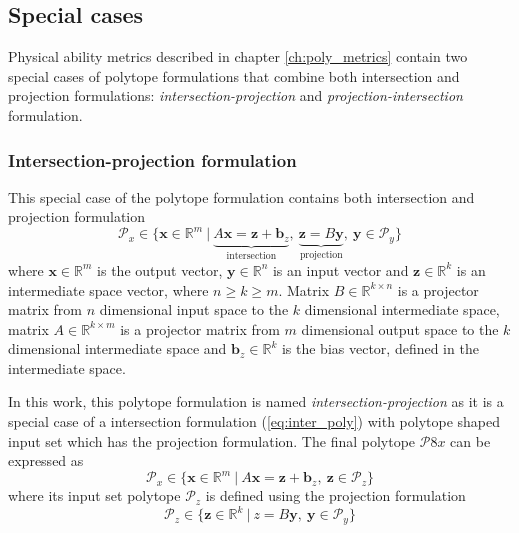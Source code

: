\subsection{Special cases}
\label{ch:combined_forms}
Physical ability metrics described in chapter \ref{ch:poly_metrics} contain two special cases of polytope formulations that combine both intersection and projection formulations: \textit{intersection-projection} and \textit{projection-intersection} formulation.

\subsubsection{Intersection-projection formulation}
\label{ch:inter_proj_form}

This special case of the polytope formulation contains both intersection and projection formulation
\begin{equation}
    \mathcal{P}_x \in \{\bm{x}\in \mathbb{R}^m~|~\underbrace{A \bm{x}= \bm{z}+ \bm{b}_z}_{\text{intersection}},~ \underbrace{ \bm{z}=B \bm{y}}_{\text{projection}} ,~ \bm{y} \in \mathcal{P}_y\} 
    \label{eq:inter_proj_poly}
\end{equation}
where $\bm{x}\in\mathbb{R}^m$ is the output vector, $\bm{y} \in \mathbb{R}^n$ is an input vector and $\bm{z}\in\mathbb{R}^k$ is an intermediate space vector, where $n\!\geq\!k\!\geq\!m$. Matrix $B\in \mathbb{R}^{k \times n}$ is a projector matrix from $n$ dimensional input space to the $k$ dimensional intermediate space, matrix $A\in \mathbb{R}^{k\times m}$ is a projector matrix from $m$ dimensional output space to the $k$ dimensional intermediate space and $\bm{b}_z\in\mathbb{R}^k$ is the bias vector, defined in the intermediate space.

In this work, this polytope formulation is named \textit{intersection-projection} as it is a special case of a intersection formulation (\ref{eq:inter_poly}) with polytope shaped input set which has the projection formulation. The final polytope $\mathcal{P}8x$ can be expressed as
\begin{equation}
    \mathcal{P}_x \in \{\bm{x}\in \mathbb{R}^m~|~A \bm{x} = \bm{z} + \bm{b}_z,~ \bm{z} \in \mathcal{P}_z\} 
\end{equation}
where its input set polytope $\mathcal{P}_z$ is defined using the projection formulation
\begin{equation}
    \mathcal{P}_z \in \{\bm{z}\in \mathbb{R}^k~|~z = B\bm{y},~ \bm{y} \in \mathcal{P}_y\} 
\end{equation}

